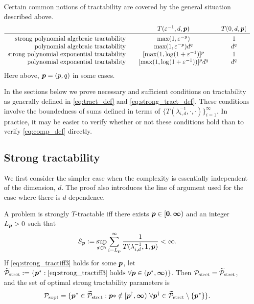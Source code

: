 \documentclass[11pt,a4paper]{article}
\begin{document}
Certain common notions of tractability are covered by the general situation described above.
\begin{equation*}
	\begin{array}{r@{\qquad}c@{\qquad}cc}
		& T(\varepsilon^{-1},d,\vp)
		& T(0,d,\vp)\\
		\toprule
		\text{strong polynomial algebraic  tractability} & \max(1,\varepsilon^{-p}) & 1\\
		\text{polynomial algebraic tractability} & \max(1,\varepsilon^{-p})d^{q} & d^{q}\\
		\text{strong polynomial exponential tractability} &  [\max(1,\log(1 + \varepsilon^{-1})]^p & 1\\
		\text{polynomial exponential tractability} &
		[\max(1,\log(1 + \varepsilon^{-1}))]^p  d^{q} & d^{q}
	\end{array}
\end{equation*}
Here above, $\boldsymbol{p} = (p,q)$ in some cases.


In the sections below we prove necessary and sufficient conditions on tractability as generally defined in \eqref{eq:tract_def} and \eqref{eq:strong_tract_def}.  These conditions involve the boundedness of sums defined in terms of $\{T(\lambda_{i,d}^{-1},\cdot, \cdot)\}_{i=1}^\infty$.  In practice, it may be easier to verify whether or not these conditions hold than to verify \eqref{eq:comp_def} directly.


\subsection{Strong tractability}

We first consider the simpler case when the complexity is essentially independent of the dimension, $d$.  The proof also introduces the line of argument used for the case where there is $d$ dependence.

\begin{theorem}\label{thm_main_strong_tract2}
A problem is strongly $T$-tractable iff there exists $\boldsymbol{p} \in [\boldsymbol{0}, \boldsymbol{\infty})$ and an integer $L_{\boldsymbol{p}} > 0$ such that
\begin{equation} \label{eq:strong_tractiff3}
     S_{\boldsymbol{p}}:=\sup_{d \in \mathbb{N}} \sum_{i = L_{\boldsymbol{p}}}^\infty \frac{1}{T(\lambda_{i,d}^{-1},1,\boldsymbol{p})} < \infty.
\end{equation}
If \eqref{eq:strong_tractiff3} holds for some $\boldsymbol{p}$, let  $\widetilde{\mathcal{P}}_{\textup{strct}} : = \{\boldsymbol{p}^* : \eqref{eq:strong_tractiff3} \text{ holds }\forall \boldsymbol{p} \in (\boldsymbol{p}^*,\boldsymbol{\infty})\}$.  Then $\mathcal{P}_{\textup{strct}} = \widetilde{\mathcal{P}}_{\textup{strct}}$, and the set of optimal strong tractability parameters is
\[
	\mathcal{P}_{\textup{sopt}} =
	\{\boldsymbol{p}^* \in \widetilde{\mathcal{P}}_{\textup{strct}} :  \boldsymbol{p}* \notin [\boldsymbol{p}^\dagger,\boldsymbol{\infty}) \ \forall \boldsymbol{p}^\dagger \in  \widetilde{\mathcal{P}}_{\textup{strct}} \setminus \{\boldsymbol{p}^*\} \}.
\]
\end{theorem}
\end{document}

